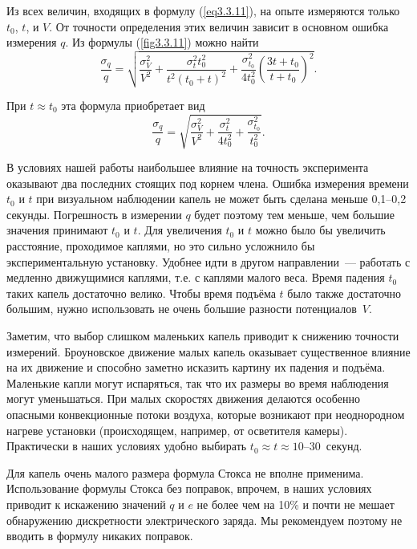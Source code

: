 Из всех величин, входящих в формулу (\ref{eq3.3.11}), на опыте измеряются только $t_0$, $t$, и $V$. От точности определения этих величин зависит в основном ошибка измерения $q$. Из формулы (\ref{fig3.3.11}) можно найти
\begin{equation}
\frac{\sigma_q}{q}=\sqrt{\frac{\sigma^2_V}{V^2}+\frac{\sigma^2_t t_0^2}{t^2(t_0+t)^2}+
\frac{\sigma^2_{t_0}}{4t^2_0}\left(\frac{3t+t_0} {t+t_0}\right)^2}.
\label{eq3.3.12}
\end{equation}

При $t\approx t_0$ эта формула приобретает вид
\begin{equation}
\frac{\sigma_q}{q}=\sqrt{\frac{\sigma^2_V}{V^2}+ \frac{\sigma^2_t}{4t^2_0}+ \frac{\sigma^2_{t_0}}{t^2_0}}.
\label{eq3.3.13}
\end{equation}

В условиях нашей работы наибольшее влияние на точность эксперимента оказывают два последних стоящих под корнем члена. Ошибка измерения времени $t_0$ и $t$ при визуальном наблюдении капель не может быть сделана меньше 0,1--0,2 секунды. Погрешность в измерении $q$ будет поэтому тем меньше, чем большие значения принимают $t_0$ и $t$. Для увеличения $t_0$ и $t$ можно было бы увеличить расстояние, проходимое каплями, но это сильно усложнило бы экспериментальную установку.
Удобнее идти в другом направлении~--- работать с медленно движущимися каплями, т.е. с каплями малого веса. Время падения $t_0$ таких капель достаточно велико. Чтобы время подъёма $t$ было также достаточно большим, нужно использовать не очень большие разности потенциалов~$V$.

Заметим, что выбор слишком маленьких капель приводит к снижению точности измерений. Броуновское движение малых капель оказывает существенное влияние на их движение и способно заметно исказить картину их падения и подъёма. Маленькие капли могут испаряться, так что их размеры во время наблюдения могут уменьшаться. При малых скоростях движения делаются особенно опасными конвекционные потоки воздуха, которые возникают при неоднородном нагреве установки (происходящем, например, от осветителя камеры). Практически в наших условиях удобно выбирать $t_0\approx t\approx 10$--30~секунд.

Для капель очень малого размера формула Стокса не вполне применима. Использование формулы Стокса без поправок, впрочем, в наших условиях приводит к искажению значений $q$ и $e$ не более чем на 10\% и почти не мешает обнаружению дискретности электрического заряда. Мы рекомендуем поэтому не вводить в формулу никаких поправок.

